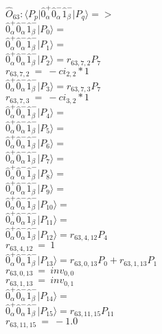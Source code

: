 \documentclass[14pt]{article}
\begin{document}
    $\hat{O}_{63}:  \langle{P_p}\vert \hat{0}_{\alpha}^{+}\hat{0}_{\alpha}^{-}\hat{1}_{\beta}^{-} \vert{P_q}\rangle => $ \\ 
    $ \hat{0}_{\alpha}^{+}\hat{0}_{\alpha}^{-}\hat{1}_{\beta}^{-} \vert{P_{0}}\rangle =  $ \\ 
    $ \hat{0}_{\alpha}^{+}\hat{0}_{\alpha}^{-}\hat{1}_{\beta}^{-} \vert{P_{1}}\rangle =  $ \\ 
    $ \hat{0}_{\alpha}^{+}\hat{0}_{\alpha}^{-}\hat{1}_{\beta}^{-} \vert{P_{2}}\rangle = {r}_{63,7,2}P_{7} $ \\ 
    ${r}_{63,7,2}\ =\ -{ci}_{2,2}*1 $ \\ 
    $ \hat{0}_{\alpha}^{+}\hat{0}_{\alpha}^{-}\hat{1}_{\beta}^{-} \vert{P_{3}}\rangle = {r}_{63,7,3}P_{7} $ \\ 
    ${r}_{63,7,3}\ =\ -{ci}_{3,2}*1 $ \\ 
    $ \hat{0}_{\alpha}^{+}\hat{0}_{\alpha}^{-}\hat{1}_{\beta}^{-} \vert{P_{4}}\rangle =  $ \\ 
    $ \hat{0}_{\alpha}^{+}\hat{0}_{\alpha}^{-}\hat{1}_{\beta}^{-} \vert{P_{5}}\rangle =  $ \\ 
    $ \hat{0}_{\alpha}^{+}\hat{0}_{\alpha}^{-}\hat{1}_{\beta}^{-} \vert{P_{6}}\rangle =  $ \\ 
    $ \hat{0}_{\alpha}^{+}\hat{0}_{\alpha}^{-}\hat{1}_{\beta}^{-} \vert{P_{7}}\rangle =  $ \\ 
    $ \hat{0}_{\alpha}^{+}\hat{0}_{\alpha}^{-}\hat{1}_{\beta}^{-} \vert{P_{8}}\rangle =  $ \\ 
    $ \hat{0}_{\alpha}^{+}\hat{0}_{\alpha}^{-}\hat{1}_{\beta}^{-} \vert{P_{9}}\rangle =  $ \\ 
    $ \hat{0}_{\alpha}^{+}\hat{0}_{\alpha}^{-}\hat{1}_{\beta}^{-} \vert{P_{10}}\rangle =  $ \\ 
    $ \hat{0}_{\alpha}^{+}\hat{0}_{\alpha}^{-}\hat{1}_{\beta}^{-} \vert{P_{11}}\rangle =  $ \\ 
    $ \hat{0}_{\alpha}^{+}\hat{0}_{\alpha}^{-}\hat{1}_{\beta}^{-} \vert{P_{12}}\rangle = {r}_{63,4,12}P_{4} $ \\ 
    ${r}_{63,4,12}\ =\ 1 $ \\ 
    $ \hat{0}_{\alpha}^{+}\hat{0}_{\alpha}^{-}\hat{1}_{\beta}^{-} \vert{P_{13}}\rangle = {r}_{63,0,13}P_{0}+{r}_{63,1,13}P_{1} $ \\ 
    ${r}_{63,0,13}\ =\ {inv}_{0,0} $ \\ 
    ${r}_{63,1,13}\ =\ {inv}_{0,1} $ \\ 
    $ \hat{0}_{\alpha}^{+}\hat{0}_{\alpha}^{-}\hat{1}_{\beta}^{-} \vert{P_{14}}\rangle =  $ \\ 
    $ \hat{0}_{\alpha}^{+}\hat{0}_{\alpha}^{-}\hat{1}_{\beta}^{-} \vert{P_{15}}\rangle = {r}_{63,11,15}P_{11} $ \\ 
    ${r}_{63,11,15}\ =\ -1.0 $ \\ 
    
\end{document}
